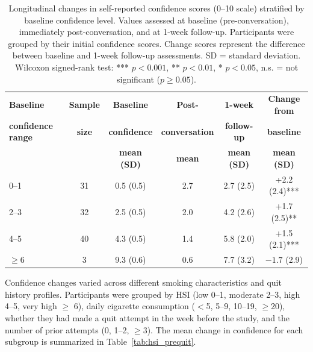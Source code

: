 \begin{table}[ht!]
  \centering
  \small
  \renewcommand{\arraystretch}{1.1}
  \begin{tabular*}{\linewidth}{@{\extracolsep{\fill}}lccccc@{}}
    \toprule
    \textbf{Baseline} & \textbf{Sample} & \textbf{Baseline} & \textbf{Post-} & \textbf{1-week} & \textbf{Change from} \\
    \textbf{confidence range} & \textbf{size} & \textbf{confidence} & \textbf{conversation} & \textbf{follow-up} & \textbf{baseline} \\
    & & \textbf{mean (SD)} & \textbf{mean} & \textbf{mean (SD)} & \textbf{mean (SD)} \\
    \midrule
    0--1   & 31 & 0.5 (0.5) & 2.7 & 2.7 (2.5) & +2.2 (2.4)*** \\
    2--3   & 32 & 2.5 (0.5) & 2.0 & 4.2 (2.6) & +1.7 (2.5)** \\
    4--5   & 40 & 4.3 (0.5) & 1.4 & 5.8 (2.0) & +1.5 (2.1)*** \\
    $\geq$6 & 3 & 9.3 (0.6) & 0.6 & 7.7 (3.2) & $-1.7$ (2.9) \\
    \bottomrule
  \end{tabular*}
  \caption{Longitudinal changes in self-reported confidence scores (0--10 scale) stratified by baseline confidence level. Values assessed at baseline (pre-conversation), immediately post-conversation, and at 1-week follow-up. Participants were grouped by their initial confidence scores. Change scores represent the difference between baseline and 1-week follow-up assessments. SD = standard deviation. Wilcoxon signed-rank test: *** $p < 0.001$, ** $p < 0.01$, * $p < 0.05$, n.s. = not significant ($p \geq 0.05$).}
  \label{tab:baseline_confidence}
\end{table}




Confidence changes varied across different smoking characteristics and quit history profiles. Participants were grouped by HSI (low 0--1, moderate 2--3, high 4--5, very high $\geq$ 6), daily cigarette consumption ($<$5, 5--9, 10--19, $\geq$20), whether they had made a quit attempt in the week before the study, and the number of prior attempts (0, 1--2, $\geq$3). The mean change in confidence for each subgroup is summarized in Table~\ref{tab:hsi_prequit}.

